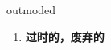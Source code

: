 
\begin{frame}
{\huge outmoded}
\begin{center}
\begin{enumerate}\Large
  \item \textbf{过时的，废弃的}
\end{enumerate}
\end{center}
\end{frame}
